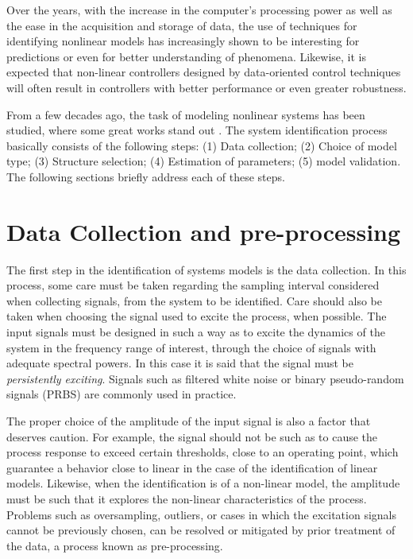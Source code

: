 Over the years, with the increase in the computer's processing power as well as the ease in the acquisition and storage of data, the use of techniques for identifying nonlinear models has increasingly shown to be interesting for predictions or even for better understanding of phenomena. Likewise, it is expected that non-linear controllers designed by data-oriented control techniques will often result in controllers with better performance or even greater robustness.

From a few decades ago, the task of modeling nonlinear systems has been studied, where some great works stand out \citep{billings1980,leontaritis1985,leontaritis1985a,korenberg1988,billings1989,chen1990,chen1992,aguirre1995,aguirre2000,zhu2005}.
The system identification process basically consists of the following steps: (1) Data collection; (2) Choice of model type; (3) Structure selection; (4) Estimation of parameters; (5) model validation. The following sections briefly address each of these steps.

\section{Data Collection and pre-processing} \label{sec:collection}
The first step in the identification of systems models is the data collection. In this process, some care must be taken regarding the sampling interval considered when collecting signals, from the system to be identified.  Care should also be taken when choosing the signal used to excite the process, when possible.
The input signals must be designed in such a way as to excite the dynamics of the system in the frequency range of interest, through the choice of signals with adequate spectral powers. In this case it is said that the signal must be \textit{persistently exciting}. Signals such as filtered white noise or binary pseudo-random signals (PRBS) are commonly used in practice.

The proper choice of the amplitude of the input signal is also a factor that deserves caution. For example, the signal should not be such as to cause the process response to exceed certain thresholds, close to an operating point, which guarantee a behavior close to linear in the case of the identification of linear models. Likewise, when the identification is of a non-linear model, the amplitude must be such that it explores the non-linear characteristics of the process.
Problems such as oversampling, outliers, or cases in which the excitation signals cannot be previously chosen, can be resolved or mitigated by prior treatment of the data, a process known as pre-processing.

